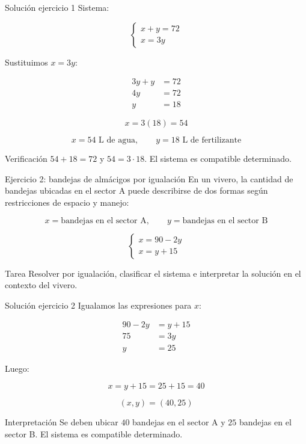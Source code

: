 \documentclass[aspectratio=169]{beamer}
\begin{document}
\begin{frame}{Solución ejercicio 1}
	\small
	Sistema:
	
	\[
	\begin{cases}
		x+y=72\\
		x=3y
	\end{cases}
	\]
	
	Sustituimos \(x=3y\):
	
	\begin{align*}
	3y+y&=72\\
	4y&=72\\
	y&=18
	\end{align*}
	
	\[
	x=3(18)=54
	\]
	
	\[
	\boxed{x=54\text{ L de agua},\qquad y=18\text{ L de fertilizante}}
	\]
	
	\begin{block}{Verificación}
		\(54+18=72\) y \(54=3\cdot18\). El sistema es compatible determinado.
	\end{block}
\end{frame}
	
\begin{frame}{Ejercicio 2: bandejas de almácigos por igualación}
	\small
	En un vivero, la cantidad de bandejas ubicadas en el sector A puede describirse de dos formas según restricciones de espacio y manejo:
	
	\[
	x=\text{bandejas en el sector A}, \qquad y=\text{bandejas en el sector B}
	\]
	
	\[
	\begin{cases}
		x=90-2y\\
		x=y+15
	\end{cases}
	\]
	
	\begin{block}{Tarea}
		Resolver por igualación, clasificar el sistema e interpretar la solución en el contexto del vivero.
	\end{block}
\end{frame}
	
\begin{frame}{Solución ejercicio 2}
	\small
	Igualamos las expresiones para \(x\):
	
	\begin{align*}
	90-2y&=y+15\\
	75&=3y\\
	y&=25
	\end{align*}
	
	Luego:
	
	\[
	x=y+15=25+15=40
	\]
	
	\[
	\boxed{(x,y)=(40,25)}
	\]
	
	\begin{block}{Interpretación}
		Se deben ubicar \(40\) bandejas en el sector A y \(25\) bandejas en el sector B. El sistema es compatible determinado.
	\end{block}
\end{frame}
	
\end{document}
